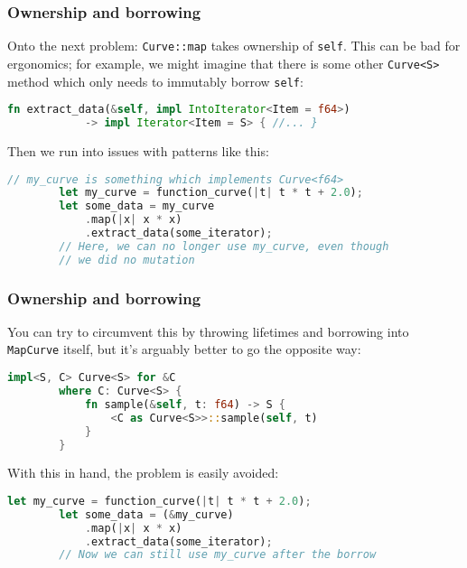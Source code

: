 \documentclass[10pt]{beamer}
\begin{document}
\begin{frame}[fragile]
    \frametitle{Ownership and borrowing}
    Onto the next problem: \texttt{Curve::map} takes ownership of \texttt{self}. This can be bad for ergonomics; for example, we might imagine that there is some other \texttt{Curve<S>} method which only needs to immutably borrow \texttt{self}:
    \begin{lstlisting}[language=Rust, gobble=8]
        fn extract_data(&self, impl IntoIterator<Item = f64>)
            -> impl Iterator<Item = S> { //... }
    \end{lstlisting}\pause
    
    Then we run into issues with patterns like this:
    \begin{lstlisting}[language=Rust, gobble=8]
        // my_curve is something which implements Curve<f64>
        let my_curve = function_curve(|t| t * t + 2.0);
        let some_data = my_curve
            .map(|x| x * x)
            .extract_data(some_iterator);
        // Here, we can no longer use my_curve, even though
        // we did no mutation
    \end{lstlisting}
\end{frame}

\begin{frame}[fragile]
    \frametitle{Ownership and borrowing}
    You can try to circumvent this by throwing lifetimes and borrowing into \texttt{MapCurve} itself, but it's arguably better to go the opposite way:\pause
    \begin{lstlisting}[language=Rust, gobble=8]
        impl<S, C> Curve<S> for &C
        where C: Curve<S> {
            fn sample(&self, t: f64) -> S {
                <C as Curve<S>>::sample(self, t)
            }
        }
    \end{lstlisting}\pause
    With this in hand, the problem is easily avoided:
    \begin{lstlisting}[language=Rust, gobble=8]
        let my_curve = function_curve(|t| t * t + 2.0);
        let some_data = (&my_curve)
            .map(|x| x * x)
            .extract_data(some_iterator);
        // Now we can still use my_curve after the borrow
    \end{lstlisting}
\end{frame}
\end{document}
